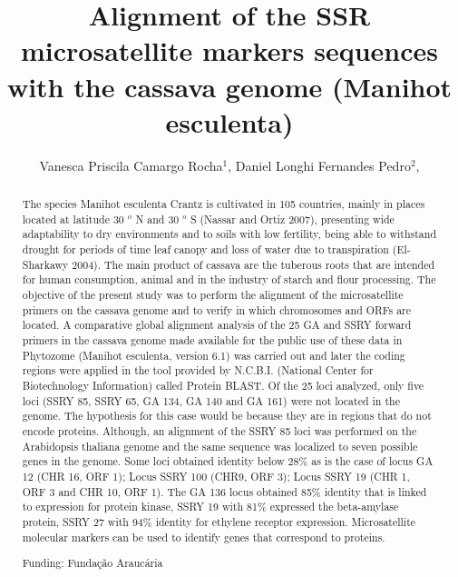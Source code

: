 \documentclass[twoside]{article}
\title{\vspace{-15mm}\fontsize{24pt}{10pt}\selectfont\textbf{ Alignment of the SSR microsatellite markers sequences with the cassava genome (Manihot esculenta) }} %
\author{ Vanesca Priscila Camargo Rocha$^{1}$, Daniel Longhi Fernandes Pedro$^{2}$, }
\affil{ 1 Universidade Tecnológica Federal do Paraná

2 UTFPR - PPGBIOINFO

 }
\date{}
\begin{document}
  
  
  \maketitle %
  
  
  \thispagestyle{fancy} %
  
  
  \begin{abstract}
  The species Manihot esculenta Crantz is cultivated in 105 countries, mainly in places located at latitude 30 $^o$ N and 30 $^o$ S (Nassar and Ortiz 2007), presenting wide adaptability to dry environments and to soils with low fertility, being able to withstand drought for periods of time leaf canopy and loss of water due to transpiration (El-Sharkawy 2004). The main product of cassava are the tuberous roots that are intended for human consumption, animal and in the industry of starch and flour processing. The objective of the present study was to perform the alignment of the microsatellite primers on the cassava genome and to verify in which chromosomes and ORFs are located. A comparative global alignment analysis of the 25 GA and SSRY forward primers in the cassava genome made available for the public use of these data in Phytozome (Manihot esculenta, version 6.1) was carried out and later the coding regions were applied in the tool provided by N.C.B.I. (National Center for Biotechnology Information) called Protein BLAST. Of the 25 loci analyzed, only five loci (SSRY 85, SSRY 65, GA 134, GA 140 and GA 161) were not located in the genome. The hypothesis for this case would be because they are in regions that do not encode proteins. Although, an alignment of the SSRY 85 loci was performed on the Arabidopsis thaliana genome and the same sequence was localized to seven possible genes in the genome. Some loci obtained identity below 28\% as is the case of locus GA 12 (CHR 16, ORF 1); Locus SSRY 100 (CHR9, ORF 3); Locus SSRY 19 (CHR 1, ORF 3 and CHR 10, ORF 1). The GA 136 locus obtained 85\% identity that is linked to expression for protein kinase, SSRY 19 with 81\% expressed the beta-amylase protein, SSRY 27 with 94\% identity for ethylene receptor expression. Microsatellite molecular markers can be used to identify genes that correspond to proteins.
  
  Funding: Funda\c{c}\~ao Arauc\'aria \\ 
  \end{abstract}
  
\end{document}
